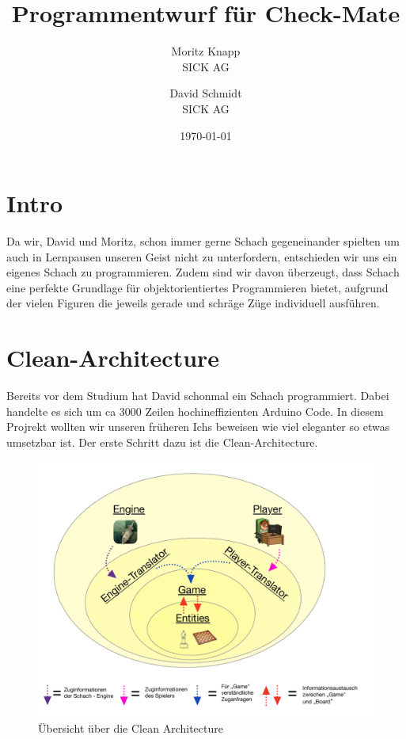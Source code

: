 \documentclass{article}
\title{Programmentwurf für Check-Mate}
\author{Moritz Knapp  \\
	SICK AG  \\
	\and 
	David Schmidt \\
	SICK AG \\
	}
\date{\today}
\begin{document}
\maketitle

\tableofcontents
\newpage

\section{Intro}

Da wir, David und Moritz, schon immer gerne Schach gegeneinander spielten um auch in Lernpausen unseren Geist nicht zu unterfordern, entschieden wir uns ein eigenes Schach zu programmieren. 
Zudem sind wir davon überzeugt, dass Schach eine perfekte Grundlage für objektorientiertes Programmieren bietet, aufgrund der vielen Figuren die jeweils gerade und schräge Züge individuell ausführen.

\section{Clean-Architecture} \label{sec:cleanArc}
Bereits vor dem Studium hat David schonmal ein Schach programmiert. Dabei handelte es sich um ca 3000 Zeilen hochineffizienten Arduino Code. In diesem Projrekt wollten wir unseren früheren Ichs beweisen wie viel eleganter so etwas umsetzbar ist. Der erste Schritt dazu ist die Clean-Architecture.

\begin{figure}[h]
	\begin{center}
		\includegraphics[width = \textwidth]{onion.pdf}
		\caption{Übersicht über die Clean Architecture}
	\end{center}
\end{figure}
\end{document}
